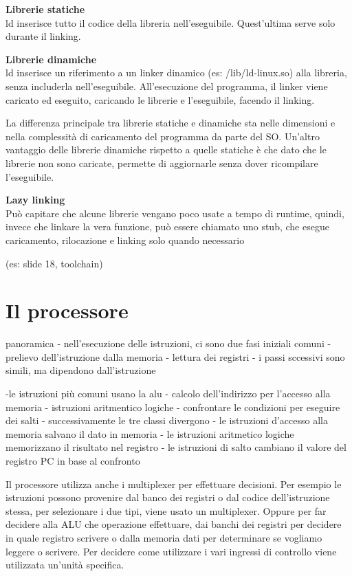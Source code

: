\documentclass[12pt, a4paper]{article}
\begin{document}
\textbf{Librerie statiche}\\ ld inserisce tutto il codice della libreria nell'eseguibile. Quest'ultima serve solo 
durante il linking. 

\textbf{Librerie dinamiche}\\ ld inserisce un riferimento a un linker dinamico (es: /lib/ld-linux.so) alla libreria,
senza includerla nell'eseguibile. All'esecuzione del programma, il linker viene caricato ed eseguito, caricando le 
librerie e l'eseguibile, facendo il linking.

La differenza principale tra librerie statiche e dinamiche sta nelle dimensioni e nella complessità di caricamento
del programma da parte del SO. Un'altro vantaggio delle librerie dinamiche rispetto a quelle statiche è che dato che 
le librerie non sono caricate, permette di aggiornarle senza dover ricompilare l'eseguibile.

\textbf{Lazy linking}\\ Può capitare che alcune librerie vengano poco usate a tempo di runtime, quindi, invece che
linkare la vera funzione, può essere chiamato uno stub, che esegue caricamento, rilocazione e linking solo quando 
necessario

(es: slide 18, toolchain)

\newpage
\section{Il processore}

panoramica
- nell'esecuzione delle istruzioni, ci sono due fasi iniziali comuni
 - prelievo dell'istruzione dalla memoria
 - lettura dei registri
- i passi sccessivi sono simili, ma dipendono dall'istruzione

-le istruzioni più comuni usano la alu 
 - calcolo dell'indirizzo per l'accesso alla memoria
 - istruzioni aritmentico logiche
 - confrontare le condizioni per eseguire dei salti
- successivamente le tre classi divergono
 - le istruzioni d'accesso alla memoria salvano il dato in memoria
 - le istruzioni aritmetico logiche memorizzano il risultato nel registro
 - le istruzioni di salto cambiano il valore del registro PC in base al confronto

Il processore utilizza anche i multiplexer per effettuare decisioni. Per esempio le istruzioni
possono provenire dal banco dei registri o dal codice dell'istruzione stessa, per selezionare
i due tipi, viene usato un multiplexer. Oppure per far decidere alla ALU che operazione effettuare,
dai banchi dei registri per decidere in quale registro scrivere o dalla memoria dati per determinare
se vogliamo leggere o scrivere. Per decidere come utilizzare i vari ingressi di controllo viene 
utilizzata un'unità specifica.
\end{document}
